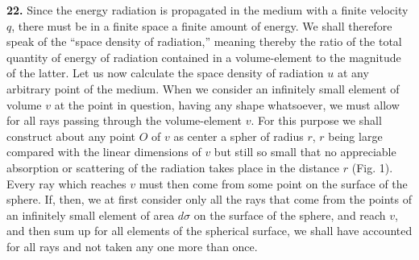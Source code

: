\documentclass[12pt,oneside]{book}
\begin{document}
\textbf{22.} Since the energy radiation is propagated in the medium with a finite velocity $q$, there must be in a finite space a finite amount of energy. We shall therefore speak of the ``space density of radiation,'' meaning thereby the ratio of the total quantity of energy of radiation contained in a volume-element to the magnitude of the latter. Let us now calculate the space density of radiation $u$ at any arbitrary point of the medium. When we consider an infinitely small element of volume $v$ at the point in question, having any shape whatsoever, we must allow for all rays passing through the volume-element $v$. For this purpose we shall construct about any point $O$ of $v$ as center a spher of radius $r$, $r$ being large compared with the linear dimensions of $v$ but still so small that no appreciable absorption or scattering of the radiation takes place in the distance $r$ (Fig. 1). Every ray which reaches $v$ must then come from some point on the surface of the sphere. If, then, we at first consider only all the rays that come from the points of an infinitely small element of area $d\sigma$ on the surface of the sphere, and reach $v$, and then sum up for all elements of the spherical surface, we shall have accounted for all rays and not taken any one more than once. \par
\begin{center}
\end{center}
\end{document}
